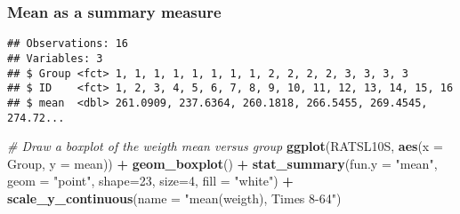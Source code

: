 \documentclass[]{article}
\newenvironment{Shaded}{\begin{snugshade}}{\end{snugshade}}
\newcommand{\KeywordTok}[1]{\textcolor[rgb]{0.13,0.29,0.53}{\textbf{#1}}}
\newcommand{\DataTypeTok}[1]{\textcolor[rgb]{0.13,0.29,0.53}{#1}}
\newcommand{\DecValTok}[1]{\textcolor[rgb]{0.00,0.00,0.81}{#1}}
\newcommand{\StringTok}[1]{\textcolor[rgb]{0.31,0.60,0.02}{#1}}
\newcommand{\CommentTok}[1]{\textcolor[rgb]{0.56,0.35,0.01}{\textit{#1}}}
\newcommand{\OperatorTok}[1]{\textcolor[rgb]{0.81,0.36,0.00}{\textbf{#1}}}
\newcommand{\NormalTok}[1]{#1}
\begin{document}
\subsubsection{Mean as a summary
measure}\label{mean-as-a-summary-measure}

\begin{Shaded}
\end{Shaded}

\begin{verbatim}
## Observations: 16
## Variables: 3
## $ Group <fct> 1, 1, 1, 1, 1, 1, 1, 1, 2, 2, 2, 2, 3, 3, 3, 3
## $ ID    <fct> 1, 2, 3, 4, 5, 6, 7, 8, 9, 10, 11, 12, 13, 14, 15, 16
## $ mean  <dbl> 261.0909, 237.6364, 260.1818, 266.5455, 269.4545, 274.72...
\end{verbatim}

\begin{Shaded}
\begin{Highlighting}[]
\CommentTok{# Draw a boxplot of the weigth mean versus group}
\KeywordTok{ggplot}\NormalTok{(RATSL10S, }\KeywordTok{aes}\NormalTok{(}\DataTypeTok{x =}\NormalTok{ Group, }\DataTypeTok{y =}\NormalTok{ mean)) }\OperatorTok{+}
\StringTok{  }\KeywordTok{geom_boxplot}\NormalTok{() }\OperatorTok{+}
\StringTok{  }\KeywordTok{stat_summary}\NormalTok{(}\DataTypeTok{fun.y =} \StringTok{"mean"}\NormalTok{, }\DataTypeTok{geom =} \StringTok{"point"}\NormalTok{, }\DataTypeTok{shape=}\DecValTok{23}\NormalTok{, }\DataTypeTok{size=}\DecValTok{4}\NormalTok{, }\DataTypeTok{fill =} \StringTok{"white"}\NormalTok{) }\OperatorTok{+}
\StringTok{  }\KeywordTok{scale_y_continuous}\NormalTok{(}\DataTypeTok{name =} \StringTok{"mean(weigth), Times 8-64"}\NormalTok{)}
\end{Highlighting}
\end{Shaded}
\end{document}
